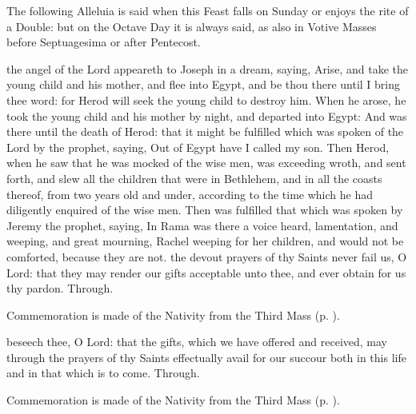 \begin{rubric}
    The following Alleluia is said when this Feast falls on Sunday or enjoys the rite of a  Double: but on the Octave Day it is always said, as also in Votive Masses before Septuagesima or after Pentecost.
\end{rubric}
 the angel of the Lord appeareth to Joseph in a dream, saying, Arise, and take the young child and his mother, and flee into Egypt, and be thou there until I bring thee word: for Herod will seek the young child to destroy him. When he arose, he took the young child and his mother by night, and departed into Egypt: And was there until the death of Herod: that it might be fulfilled which was spoken of the Lord by the prophet, saying, Out of Egypt have I called my son. Then Herod, when he saw that he was mocked of the wise men, was exceeding wroth, and sent forth, and slew all the children that were in Bethlehem, and in all the coasts thereof, from two years old and under, according to the time which he had diligently enquired of the wise men. Then was fulfilled that which was spoken by Jeremy the prophet, saying, In Rama was there a voice heard, lamentation, and weeping, and great mourning, Rachel weeping for her children, and would not be comforted, because they are not.
\secret
{} the devout prayers of thy Saints never fail us, O Lord: that they may render our gifts acceptable unto thee, and ever obtain for us thy pardon. Through.
\begin{rubric}
    Commemoration is made of the Nativity from the Third Mass (p. \pageref{NativityMassIIISecret}).
\end{rubric}
\postcommunion
{} beseech thee, O Lord: that the gifts, which we have offered and received, may through the prayers of thy Saints effectually avail for our succour both in this life and in that which is to come. Through.
\begin{rubric}
    Commemoration is made of the Nativity from the Third Mass (p. \pageref{NativityMassIIIPostcommunion}).
\end{rubric}


